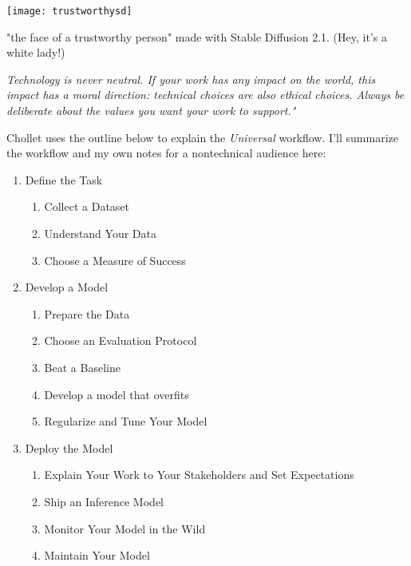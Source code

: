 \begin{marginfigure}[-5.5cm]
        \texttt{[image: trustworthysd]}
        \caption{"the face of a trustworthy person" made with Stable Diffusion 2.1. (Hey, it's a white lady!)}
\end{marginfigure}

\textit{Technology is never neutral. If your work has any impact on the world, this impact has a moral direction: technical choices are also ethical choices. Always be deliberate about the values you want your work to support."}\cite{chollet2022}

Chollet uses the outline below to explain the \textit{Universal} workflow. I'll summarize the workflow and my own notes for a nontechnical audience here:
\begin{enumerate}
    \item Define the Task 
    \begin{enumerate}
        \item Collect a Dataset 
        \item Understand Your Data 
        \item Choose a Measure of Success  
    \end{enumerate}
    \item Develop a Model
    \begin{enumerate}
        \item Prepare the Data 
        \item Choose an Evaluation Protocol
        \item Beat a Baseline 
        \item Develop a model that overfits 
        \item Regularize and Tune Your Model
    \end{enumerate}
    \item Deploy the Model
    \begin{enumerate}
        \item Explain Your Work to Your Stakeholders and Set Expectations
        \item Ship an Inference Model
        \item Monitor Your Model in the Wild
        \item Maintain Your Model
    \end{enumerate}
\end{enumerate}

